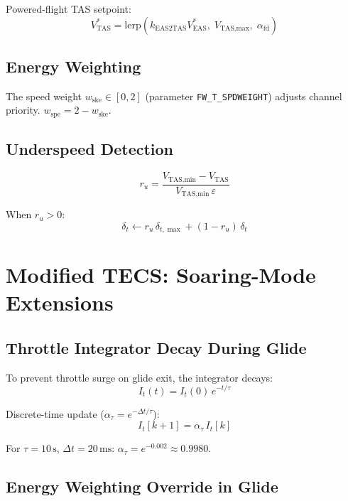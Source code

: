 \documentclass[12pt,a4paper]{report}
\begin{document}
Powered-flight TAS setpoint:
\begin{equation}
  V_{\text{TAS}}^* = \text{lerp}\!\left(
    k_{\text{EAS2TAS}} V_{\text{EAS}}^*,\;
    V_{\text{TAS,max}},\;
    \alpha_{\text{fd}}
  \right)
\end{equation}

\subsection{Energy Weighting}

The speed weight $w_{\text{ske}} \in [0,2]$ (parameter \texttt{FW\_T\_SPDWEIGHT})
adjusts channel priority. $w_{\text{spe}} = 2 - w_{\text{ske}}$.

\subsection{Underspeed Detection}

\begin{equation}
  r_u = \frac{V_{\text{TAS,min}} - V_{\text{TAS}}}{V_{\text{TAS,min}}\,\varepsilon}
\end{equation}

When $r_u > 0$:
\begin{equation}
  \delta_t \leftarrow r_u\,\delta_{t,\max} + (1-r_u)\,\delta_t
\end{equation}

\section{Modified TECS: Soaring-Mode Extensions}

\subsection{Throttle Integrator Decay During Glide}

To prevent throttle surge on glide exit, the integrator decays:
\begin{equation}
  \boxed{I_t(t) = I_t(0)\,e^{-t/\tau}}
\end{equation}

Discrete-time update ($\alpha_\tau = e^{-\Delta t/\tau}$):
\begin{equation}
  I_t[k+1] = \alpha_\tau\,I_t[k]
\end{equation}

For $\tau = 10\,\text{s}$, $\Delta t = 20\,\text{ms}$:
$\alpha_\tau = e^{-0.002} \approx 0.9980$.

\subsection{Energy Weighting Override in Glide}
\end{document}
